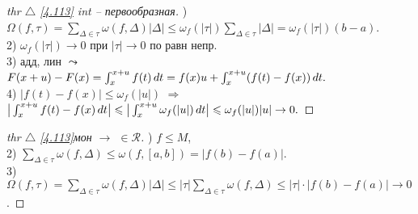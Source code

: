 \begin{minipage}[t]{0.45\textwidth}
\begin{proof}[
thr $\triangle$
\eqref{4.113} int -- первообразная]

\phantom{42}

) $\Omega(f, \tau) = \sum_{\Delta \in \tau} \omega(f, \Delta) |\Delta| \leq \omega_f (|\tau|) \sum_{\Delta \in \tau} |\Delta| = \omega_f(|\tau|)(b-a)$. \\
2) $\omega_f(|\tau|) \to 0$ при $|\tau| \to 0$ по равн непр. \\
3) адд, лин $\leadsto$ \\
$F(x + u)  - F(x)  = \int_x^{x+u} f(t) \, d t = f(x) u + \int_x^{x+u} (f(t) - f(x))\, d t.$ \\
4) $|f(t) - f(x)| \leq \omega_f(|u|)$ $\Rightarrow$ \\
$\big| \int_x^{x+u} f(t) - f(x) \, d t
\big| \leqslant 
\big| \int_x^{x+u} \omega_f (|u|) \, d t
\big| \leqslant \omega_f(|u|)|u| \to 0. 
$
\end{proof}
\end{minipage}
\hfill
\begin{minipage}[t]{0.45\textwidth}
\begin{proof}[
thr $\triangle$
\eqref{4.113}мон $\to$ $\in \mathcal{R}$]

\phantom{42}

) $f \leq M$, \\
2) $\sum_{\Delta \in \tau} \omega(f, \Delta) \leq \omega(f, [a, b]) = |f(b) - f(a)|.$ \\
3) $\Omega(f, \tau) = \sum_{\Delta \in \tau} \omega(f, \Delta) |\Delta| \leq |\tau| \sum_{\Delta \in \tau} \omega(f, \Delta) \leq |\tau| \cdot |f(b) - f(a)| \to 0$.
\end{proof}
\end{minipage}